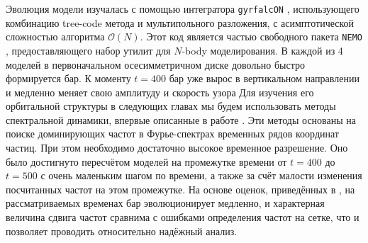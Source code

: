 \documentclass{trlnotes}
\begin{document}
Эволюция модели изучалась с помощью интегратора \texttt{gyrfalcON} \cite{dehnen2002}, использующего комбинацию
tree-code метода и мультипольного разложения, с асимптотической сложностью алгоритма $\mathcal O(N)$. Этот код 
является частью свободного пакета \texttt{NEMO} \citep{teuben1995a}, предоставляющего набор утилит для $N$-body 
моделирования. В каждой из 4 моделей в первоначальном осесимметричном диске довольно быстро формируется бар. К моменту $t=400$ бар уже вырос в вертикальном направлении и медленно меняет свою амплитуду и скорость узора%
Для изучения его орбитальной структуры в следующих главах мы будем использовать методы спектральной динамики, впервые описанные в работе \citet{binney1982}. Эти методы основаны на поиске доминирующих частот в Фурье-спектрах временных рядов координат частиц. При этом необходимо достаточно высокое временное разрешение. Оно было достигнуто пересчётом моделей на промежутке времени от $t=400$ до $t=500$ с очень маленьким шагом по времени, а также за счёт малости изменения посчитанных частот на этом промежутке. На основе оценок, приведённых в \cite{parul2020}, на рассматриваемых временах бар эволюционирует медленно, и характерная величина сдвига частот сравнима с ошибками определения частот на сетке, что и позволяет проводить относительно надёжный анализ.
\end{document}
